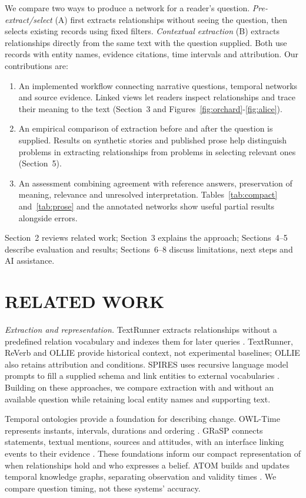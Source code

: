 \documentclass[a4paper,twoside]{article}
\begin{document}
We compare two ways to produce a network for a reader's question. \emph{Pre-extract/select} (A) first extracts relationships without seeing the question, then selects existing records using fixed filters. \emph{Contextual extraction} (B) extracts relationships directly from the same text with the question supplied. Both use records with entity names, evidence citations, time intervals and attribution. Our contributions are:

\begin{enumerate}
\item An implemented workflow connecting narrative questions, temporal networks and source evidence. Linked views let readers inspect relationships and trace their meaning to the text (Section~3 and Figures~\ref{fig:orchard}-\ref{fig:alice}).
\item An empirical comparison of extraction before and after the question is supplied. Results on synthetic stories and published prose help distinguish problems in extracting relationships from problems in selecting relevant ones (Section~5).
\item An assessment combining agreement with reference answers, preservation of meaning, relevance and unresolved interpretation. Tables~\ref{tab:compact} and~\ref{tab:prose} and the annotated networks show useful partial results alongside errors.
\end{enumerate}

Section~2 reviews related work; Section~3 explains the approach; Sections~4--5 describe evaluation and results; Sections~6--8 discuss limitations, next steps and AI assistance.

\OrchardFigure
\section{\uppercase{Related Work}}
\noindent \emph{Extraction and representation.} TextRunner extracts relationships without a predefined relation vocabulary and indexes them for later queries \cite{banko2007}. TextRunner, ReVerb \cite{fader2011} and OLLIE \cite{mausam2012} provide historical context, not experimental baselines; OLLIE also retains attribution and conditions. SPIRES uses recursive language model prompts to fill a supplied schema and link entities to external vocabularies \cite{caufield2024}. Building on these approaches, we compare extraction with and without an available question while retaining local entity names and supporting text.

Temporal ontologies provide a foundation for describing change. OWL-Time represents instants, intervals, durations and ordering \cite{time2017}. GRaSP connects statements, textual mentions, sources and attitudes, with an interface linking events to their evidence \cite{fokkens2017}. These foundations inform our compact representation of when relationships hold and who expresses a belief. ATOM builds and updates temporal knowledge graphs, separating observation and validity times \cite{lairgi2026}. We compare question timing, not these systems' accuracy.
\end{document}
